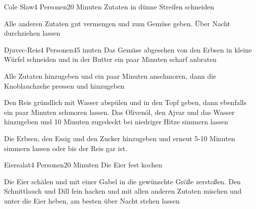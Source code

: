 
\begin{recipe}{Cole Slaw}{4 Personen}{20 Minuten}
Zutaten in dünne Streifen schneiden

Alle anderen Zutaten gut vermengen und zum Gemüse geben.
Über Nacht durchziehen lassen
\end{recipe}


\begin{recipe}{Djuvec-Reis}{4 Personen}{45 inuten}
Das Gemüse abgesehen von den Erbsen in kleine Würfel schneiden und in der Butter ein paar Minuten scharf anbraten

Alle Zutaten hinzugeben und ein paar Minuten anschmoren, dann die Knoblauchzehe pressen und hinzugeben

Den Reis gründlich mit Wasser abspülen und in den Topf geben, dann ebenfalls ein paar Minuten schmoren lassen.
Das Olivenöl, den Ajvar und das Wasser hinzugeben und 10 Minuten zugedeckt bei niedriger Hitze simmern lassen

Die Erbsen, den Essig und den Zucker hinzugeben und erneut 5-10 Minuten simmern lassen oder bis der Reis gar ist.
\end{recipe}


\begin{recipe}{Eiersalat}{4 Personen}{20 Minuten}
Die Eier fest kochen

Die Eier schälen und mit einer Gabel in die gewünschte Größe zerstoßen. Den Schnittlauch und Dill fein hacken und mit allen anderen Zutaten mischen und unter die Eier heben, am besten über Nacht stehen lassen
\end{recipe}

